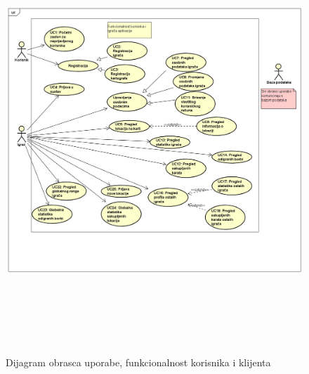 					\begin{figure}[H]
						\includegraphics[width=\textwidth, height=16cm]{dijagrami/OU_igrac} 
						\centering
						\caption{Dijagram obrasca uporabe, funkcionalnost korisnika i klijenta}
						\label{}
					\end{figure}
					
